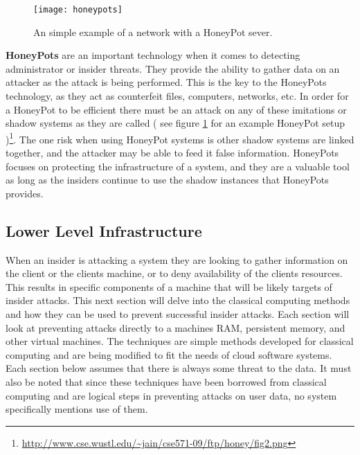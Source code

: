 \label{hlHoneyPots}

\begin{figure}
  \centering
    \texttt{[image: honeypots]}
  \caption{An simple example of a network with a HoneyPot sever.}
  \label{honeypot_image}
\end{figure}

\textbf{HoneyPots} are an important technology when it comes to detecting administrator or insider threats. They provide the ability to gather data on an attacker as the attack is being performed. This is the key to the HoneyPots technology, as they act as counterfeit files, computers, networks, etc. In order for a HoneyPot to be efficient there must be an attack on any of these imitations or shadow systems as they are called ( see figure \ref{honeypot_image} for an example HoneyPot setup )\footnote{\url{http://www.cse.wustl.edu/~jain/cse571-09/ftp/honey/fig2.png}}. \cite{spitzner} The one risk when using HoneyPot systems is other shadow systems are linked together, and the attacker may be able to feed it false information. HoneyPots focuses on protecting the infrastructure of a system, and they are a valuable tool as long as the insiders continue to use the shadow instances that HoneyPots provides. \cite{spitzner}

\subsection{Lower Level Infrastructure}
\label{llInfrastructure}

When an insider is attacking a system they are looking to gather information on the client or the clients machine, or to deny availability of the clients resources. \cite{kandias} This results in specific components of a machine that will be likely targets of insider attacks. This next section will delve into the classical computing methods and how they can be used to prevent successful insider attacks. Each section will look at preventing attacks directly to a machines RAM, persistent memory, and other virtual machines. The techniques are simple methods developed for classical computing and are being modified to fit the needs of cloud software systems. Each section below assumes that there is always some threat to the data. It must also be noted that since these techniques have been borrowed from classical computing and are logical steps in preventing attacks on user data, no system specifically mentions use of them. \cite{szefer}

\label{llEncryption}

